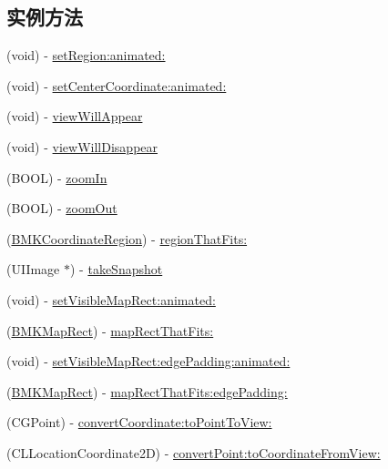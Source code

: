 \subsection*{实例方法}
\begin{DoxyCompactItemize}
\item 
(void) -\/ \hyperlink{interface_b_m_k_map_view_af182240990fe7ad8ff8b709456200fed}{set\-Region\-:animated\-:}
\item 
(void) -\/ \hyperlink{interface_b_m_k_map_view_a02c0933bb56354f30695a6634e416e26}{set\-Center\-Coordinate\-:animated\-:}
\item 
(void) -\/ \hyperlink{interface_b_m_k_map_view_a6ce8ac560bd901b93b3e15d6996a409a}{view\-Will\-Appear}
\item 
(void) -\/ \hyperlink{interface_b_m_k_map_view_a0cfbfc217062e84de41ddb04dcad7e67}{view\-Will\-Disappear}
\item 
(B\-O\-O\-L) -\/ \hyperlink{interface_b_m_k_map_view_a349f7c74871a389d73955edd7bcd9fdf}{zoom\-In}
\item 
(B\-O\-O\-L) -\/ \hyperlink{interface_b_m_k_map_view_a1806c818757917ef674ebe5ba24fe5a2}{zoom\-Out}
\item 
(\hyperlink{struct_b_m_k_coordinate_region}{B\-M\-K\-Coordinate\-Region}) -\/ \hyperlink{interface_b_m_k_map_view_a5a1387f64868bf341cbf743063a91d28}{region\-That\-Fits\-:}
\item 
(U\-I\-Image $\ast$) -\/ \hyperlink{interface_b_m_k_map_view_af2af641b86f327aa9f2a16050d380db2}{take\-Snapshot}
\item 
(void) -\/ \hyperlink{interface_b_m_k_map_view_ad90d3e9ceabed218dcb90d9fc8247902}{set\-Visible\-Map\-Rect\-:animated\-:}
\item 
(\hyperlink{struct_b_m_k_map_rect}{B\-M\-K\-Map\-Rect}) -\/ \hyperlink{interface_b_m_k_map_view_a58f9c0d783d39cd0d028ae94ca408de8}{map\-Rect\-That\-Fits\-:}
\item 
(void) -\/ \hyperlink{interface_b_m_k_map_view_a1e5a69629b90ac2f571284e2e6c32397}{set\-Visible\-Map\-Rect\-:edge\-Padding\-:animated\-:}
\item 
(\hyperlink{struct_b_m_k_map_rect}{B\-M\-K\-Map\-Rect}) -\/ \hyperlink{interface_b_m_k_map_view_a93e07fbbe602a9a493650158babd2349}{map\-Rect\-That\-Fits\-:edge\-Padding\-:}
\item 
(C\-G\-Point) -\/ \hyperlink{interface_b_m_k_map_view_a46ec1b9f485f41a04ffe76300624f5b4}{convert\-Coordinate\-:to\-Point\-To\-View\-:}
\item 
(C\-L\-Location\-Coordinate2\-D) -\/ \hyperlink{interface_b_m_k_map_view_a6ab0dbfdf28bf2ab29174d9a70ce2e9c}{convert\-Point\-:to\-Coordinate\-From\-View\-:}

\end{DoxyCompactItemize}
